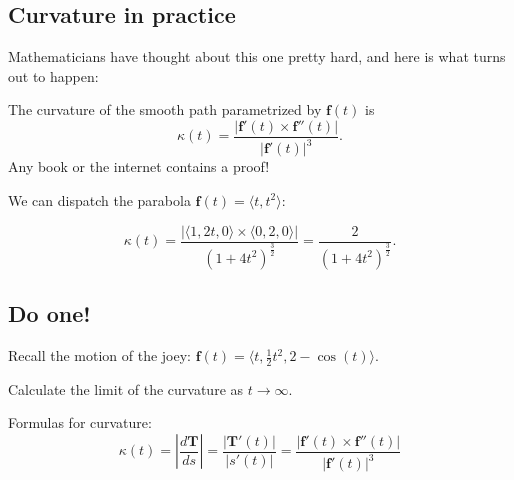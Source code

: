 \documentclass[]{article}
\begin{document}
\subsection{Curvature in practice}\label{curvature-in-practice}

Mathematicians have thought about this one pretty hard, and here is what
turns out to happen:

The curvature of the smooth path parametrized by $\mathbf f(t)$ is
\[\kappa(t)=\frac{|\mathbf f'(t)\times\mathbf f''(t)|}{|\mathbf
f'(t)|^3}.\] Any book or the internet contains a proof!

We can dispatch the parabola $\mathbf f(t)=\langle t,t^2\rangle$:

\[\kappa(t)=\frac{|\langle 1,2t,0\rangle\times\langle
0,2,0\rangle|}{(1+4t^2)^\frac{3}{2}}=\frac{2}{(1+4t^2)^\frac{3}{2}}.\]

\subsection{Do one!}\label{do-one}

Recall the motion of the joey:
$\mathbf f(t)=\langle t,\frac{1}{2}t^2,2-\cos(t)\rangle$.

Calculate the limit of the curvature as $t\to\infty$.

Formulas for curvature: \[\kappa(t)=\left|\frac{d\mathbf
T}{ds}\right|=\frac{|\mathbf T'(t)|}{|s'(t)|}=\frac{|\mathbf
f'(t)\times\mathbf f''(t)|}{|\mathbf f'(t)|^3}\]
\end{document}
